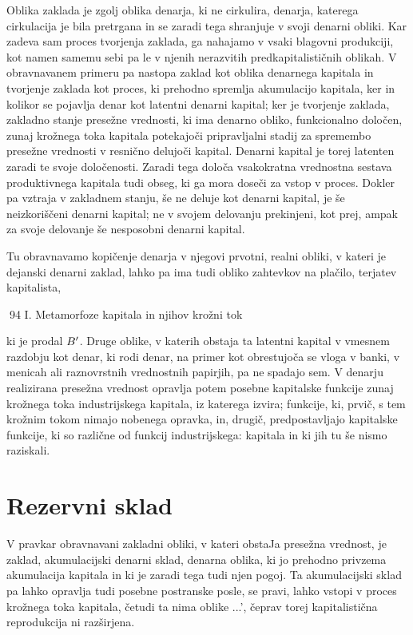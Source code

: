 \documentclass[kapital_02.tex]{subfiles}
\begin{document}
Oblika zaklada je zgolj oblika denarja, ki ne cirkulira, denarja, katerega cirkulacija je bila pretrgana in se zaradi tega shranjuje v svoji denarni obliki. Kar zadeva sam proces tvorjenja zaklada, ga nahajamo v vsaki blagovni produkciji, kot namen samemu sebi pa le v njenih nerazvitih predkapitalističnih oblikah. V obravnavanem primeru pa nastopa zaklad kot oblika denarnega kapitala in tvorjenje zaklada kot proces, ki prehodno spremlja akumulacijo kapitala, ker in kolikor se pojavlja denar kot latentni denarni kapital; ker je tvorjenje zaklada, zakladno stanje presežne vrednosti, ki ima denarno obliko, funkcionalno določen, zunaj krožnega toka kapitala potekajoči pripravljalni stadij za spremembo presežne vrednosti v resnično delujoči kapital. Denarni kapital je torej latenten zaradi te svoje določenosti. Zaradi tega določa vsakokratna vrednostna sestava produktivnega kapitala tudi obseg, ki ga mora doseči za vstop v proces. Dokler pa vztraja v zakladnem stanju, še ne deluje kot denarni kapital, je še neizkoriščeni denarni kapital; ne v svojem delovanju prekinjeni, kot prej, ampak za svoje delovanje še nesposobni denarni kapital.

Tu obravnavamo kopičenje denarja v njegovi prvotni, realni obliki, v kateri je dejanski denarni zaklad, lahko pa ima tudi obliko zahtevkov na plačilo, terjatev kapitalista,



94 I. Metamorfoze kapitala in njihov krožni tok



 ki je prodal \( B' \). Druge oblike, v katerih obstaja ta latentni kapital v vmesnem razdobju kot denar, ki rodi denar, na primer kot obrestujoča se vloga v banki, v menicah ali raznovrstnih vrednostnih papirjih, pa ne spadajo sem. V denarju realizirana presežna vrednost opravlja potem posebne kapitalske funkcije zunaj krožnega toka industrijskega kapitala, iz katerega izvira; funkcije, ki, prvič, s tem krožnim tokom nimajo nobenega opravka, in, drugič, predpostavljajo kapitalske funkcije, ki so različne od funkcij industrijskega: kapitala in ki jih tu še nismo raziskali.

\section{Rezervni sklad}

V pravkar obravnavani zakladni obliki, v kateri obstaJa presežna vrednost, je zaklad, akumulacijski denarni sklad, denarna oblika, ki jo prehodno privzema akumulacija kapitala in ki je zaradi tega tudi njen pogoj. Ta akumulacijski sklad pa lahko opravlja tudi posebne postranske posle, se pravi, lahko vstopi v proces krožnega toka kapitala, četudi ta nima oblike \KPEP...\KPEP', čeprav torej kapitalistična reprodukcija ni razširjena.
\end{document}
